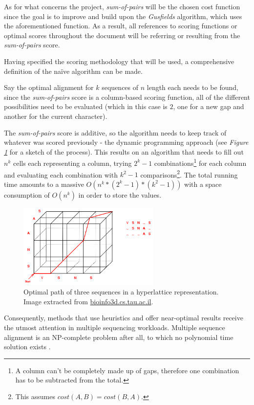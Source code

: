 \documentclass[twoside,openright,titlepage,numbers=noenddot,headinclude,%
                footinclude=true,cleardoublepage=empty,abstractoff, %
                BCOR=5mm,paper=a4,fontsize=11pt,%
                ngerman,american,%
                ]{scrreprt}
\begin{document}
As for what concerns the project, \textit{sum-of-pairs} will be the chosen cost function since the goal is to improve and build upon the \textit{Gusfields} algorithm, which uses the aforementioned function. As a result, all references to scoring functions or optimal scores throughout the document will be referring or resulting from the \textit{sum-of-pairs} score.

Having specified the scoring methodology that will be used, a comprehensive definition of the naïve algorithm can be made.

Say the optimal alignment for $k$ sequences of $n$ length each needs to be found, since the \textit{sum-of-pairs} score is a column-based scoring function, all of the different possibilities need to be evaluated (which in this case is $2$, one for a new gap and another for the current character). 

The \textit{sum-of-pairs} score is additive, so the algorithm needs to keep track of whatever was scored previously - the dynamic programming approach (see \textit{Figure \ref{fig:dp-msa}} for a sketch of the process). This results on an algorithm that needs to fill out $n^{k}$ cells each representing a column, trying $2^{k}-1$ combinations\footnote{A column can't be completely made up of gaps, therefore one combination has to be subtracted from the total.} for each column and evaluating each combination with $k^{2}-1$ comparisons\footnote{This assumes $cost(A,B) = cost(B,A)$.}. The total running time amounts to a massive $O(n^{k} * (2^{k}-1) * (k^{2}-1))$ with a space consumption of $O(n^{k})$ in order to store the values.

\begin{figure}
    \centering
    \includegraphics[width=7cm]{dp-msa.png}
    \caption{Optimal path of three sequences in a hyperlattice representation. Image extracted from \url{bioinfo3d.cs.tau.ac.il}.}
    \label{fig:dp-msa}
\end{figure}
 
Consequently, methods that use heuristics and offer near-optimal results receive the utmost attention in multiple sequencing workloads. Multiple sequence alignment is an NP-complete problem after all, to which no polynomial time solution exists \cite{cornell-msa}.
\end{document}
